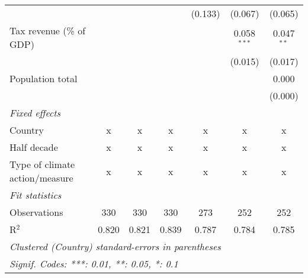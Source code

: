 \begin{tabular}{lcccccc}
                                                             &         &         &                & (0.133)        & (0.067)        & (0.065)\\   
   Tax revenue (\% of GDP)                                   &         &         &                &                & 0.058$^{***}$  & 0.047$^{**}$\\   
                                                             &         &         &                &                & (0.015)        & (0.017)\\   
   Population total                                          &         &         &                &                &                & 0.000\\   
                                                             &         &         &                &                &                & (0.000)\\   
   \emph{Fixed effects}\\
   Country                                                   & x       & x       & x              & x              & x              & x\\  
   Half decade                                               & x       & x       & x              & x              & x              & x\\  
   Type of climate action/measure                            & x       & x       & x              & x              & x              & x\\  
   \midrule \emph{Fit statistics}\\
   Observations                                              & 330     & 330     & 330            & 273            & 252            & 252\\  
   R$^2$                                                     & 0.820   & 0.821   & 0.839          & 0.787          & 0.784          & 0.785\\  
   \midrule
   \multicolumn{7}{l}{\emph{Clustered (Country) standard-errors in parentheses}}\\
   \multicolumn{7}{l}{\emph{Signif. Codes: ***: 0.01, **: 0.05, *: 0.1}}\\
\end{tabular}
\par\endgroup


